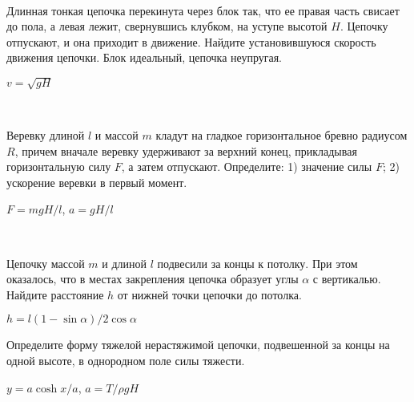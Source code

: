 \begin{ex}
\hspace{0pt} \\
\begin{minipage}{.65\textwidth}
Длинная тонкая цепочка перекинута через блок так, что ее правая часть свисает до пола, а левая лежит, свернувшись клубком, на уступе высотой $H$. Цепочку отпускают, и она приходит в движение. Найдите установившуюся скорость движения цепочки. Блок идеальный, цепочка неупругая.
\end{minipage}
\begin{minipage}{.35\textwidth}
\centering

\end{minipage}
\begin{ans}
$v = \sqrt{gH}$
\end{ans}
\end{ex}

\begin{samepage}
\begin{ex}
\hspace{0pt} \\
\begin{minipage}{.65\textwidth}
Веревку длиной $l$ и массой $m$ кладут на гладкое горизонтальное бревно радиусом $R$, причем вначале веревку удерживают за верхний конец, прикладывая горизонтальную силу $F$, а затем отпускают. Определите: 1) значение силы $F$; 2) ускорение веревки в первый момент.
\end{minipage}
\begin{minipage}{.35\textwidth}
\centering

\end{minipage}
\begin{ans}
$F = mgH/l$, $a = gH/l$
\end{ans}
\end{ex}
\end{samepage}

\begin{ex}
\hspace{0pt} \\
\begin{minipage}{.65\textwidth}
Цепочку массой $m$ и длиной $l$ подвесили за концы к потолку. При этом оказалось, что в местах закрепления цепочка образует углы $\alpha $ с вертикалью. Найдите расстояние $h$ от нижней точки цепочки до потолка.
\end{minipage}
\begin{minipage}{.35\textwidth}
\centering

\end{minipage}
\begin{ans}
$h = l(1 - \sin \alpha)/2 \cos \alpha$
\end{ans}
\end{ex}

\begin{ex}
Определите форму тяжелой нерастяжимой цепочки, подвешенной за концы на одной высоте, в однородном поле силы тяжести.
\begin{ans}
$y = a \cosh x/a$, $a = T/\rho g H$
\end{ans}
\end{ex}
